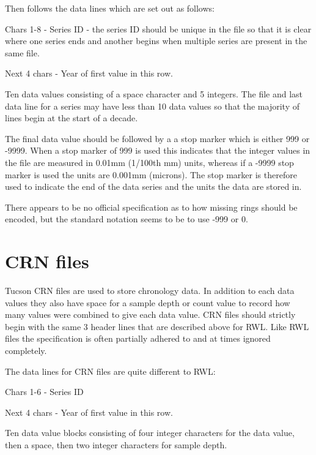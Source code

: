 Then follows the data lines which are set out as follows:

\begin{itemize*}
    \item  Chars 1-8 - Series ID - the series ID should be unique in the file so that it is clear where one series ends and another begins when multiple series are present in the same file.
    \item  Next 4 chars - Year of first value in this row.
    \item  Ten data values consisting of a space character and 5 integers. The file and last data line for a series may have less than 10 data values so that the majority of lines begin at the start of a decade.  
\end{itemize*}

The final data value should be followed by a a stop marker which is either 999 or -9999. When a stop marker of 999 is used this indicates that the integer values in the file are measured in 0.01mm (1/100th mm) units, whereas if a -9999 stop marker is used the units are 0.001mm (microns). The stop marker is therefore used to indicate the end of the data series and the units the data are stored in.

There appears to be no official specification as to how missing rings should be encoded, but the standard notation seems to be to use -999 or 0. 

\section{CRN files}

Tucson CRN files are used to store chronology data. In addition to each data values they also have space for a sample depth or count value to record how many values were combined to give each data value. CRN files should strictly begin with the same 3 header lines that are described above for RWL. Like RWL files the specification is often partially adhered to and at times ignored completely.

The data lines for CRN files are quite different to RWL:

\begin{itemize*}
    \item  Chars 1-6 - Series ID
    \item  Next 4 chars - Year of first value in this row.
    \item  Ten data value blocks consisting of four integer characters for the data value, then a space, then two integer characters for sample depth. 
\end{itemize*}


